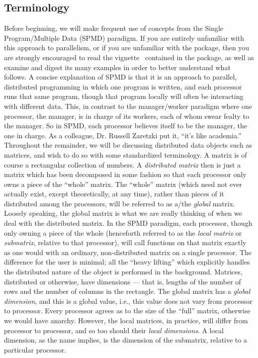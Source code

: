 \subsection[]{Terminology}
Before beginning, we will make frequent use of concepts from the Single Program/Multiple Data (SPMD) paradigm.  If you are entirely unfamiliar with this approach to parallelism, or if you are unfamiliar with the  package, then you are strongly encouraged to read the vignette~\citep{Chen2012pbdMPIvignette} contained in the  package, as well as examine and digest its many examples in order to better understand what follows.
\np
A concise explanation of SPMD is that it is an approach to parallel, distributed programming in which one program is written, and each processor runs that same program, though that program locally will often be interacting with different data.  This, in contrast to the manager/worker paradigm where one processor, the manager, is in charge of its workers, each of whom swear fealty to the manager.  So in SPMD, each processor believes itself to be the manager, the one in charge.  As a colleague, Dr. Russell Zaretzki put it, ``it's like academia.''
\np
Throughout the remainder, we will be discussing distributed data objects such as matrices, and wish to do so with some standardized terminology.  A matrix is of course a rectangular collection of numbers.  A \emph{distributed matrix} then is just a matrix which has been decomposed in some fashion so that each processor only owns a piece of the ``whole'' matrix.  The ``whole'' matrix (which need not ever actually exist, except theoretically, at any time), rather than pieces of it distributed among the processors, will be referred to as a/the \emph{global} matrix.  Loosely speaking, the global matrix is what we are really thinking of when we deal with the distributed matrix.  
\np
In the SPMD paradigm, each processor, though only owning a piece of the whole (henceforth referred to as the \emph{local matrix} or \emph{submatrix}, relative to that processor), will call functions on that matrix exactly as one would with an ordinary, non-distributed matrix on a single processor.  The difference for the user is minimal; all the ``heavy lifting'' which explicitly handles the distributed nature of the object is performed in the background.
\np
Matrices, distributed or otherwise, have dimensions --- that is, lengths of the number of rows and the number of columns in the rectangle.  The global matrix has a \emph{global dimension}, and this is a global value, i.e., this value does not vary from processor to processor.  Every processor agrees as to the size of the ``full'' matrix, otherwise we would have anarchy.  However, the local matrices, in practice, will differ from processor to processor, and so too should their \emph{local dimensions}.  A local dimension, as the name implies, is the dimension of the submatrix, relative to a particular processor.

